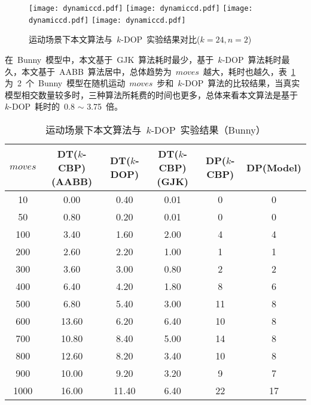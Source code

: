\begin{figure}[htbp] 
\centering
{}
{  
   \texttt{[image: dynamiccd.pdf]}
}
{  
    \texttt{[image: dynamiccd.pdf]}
}\linebreak %
{  
   \texttt{[image: dynamiccd.pdf]}
}
{  
   \texttt{[image: dynamiccd.pdf]}
}

\caption{运动场景下本文算法与~$k$-DOP~实验结果对比($k=24,n=2$)}
\label{fig:chart:exps:kdop:kcbp:k24:dynamic}
\end{figure}

在~Bunny~模型中，本文基于~GJK~算法耗时最少，基于~$k$-DOP~算法耗时最久，本文基于~AABB~算法居中，总体趋势为~$moves$~越大，耗时也越久，表~\ref{tab:exp:bunny:k24:kdop:kcbp:detail:dynamic}~
为~2~个~Bunny~模型在随机运动~$moves$~步和~$k$-DOP~算法的比较结果，当真实模型相交数量较多时，三种算法所耗费的时间也更多，总体来看本文算法是基于~$k$-DOP~耗时的~0.8 $\sim$ 3.75~倍。

\begin{table}[htbp]  
\centering
\caption{运动场景下本文算法与~$k$-DOP~实验结果（Bunny）}
\label{tab:exp:bunny:k24:kdop:kcbp:detail:dynamic}
\begin{tabular}{cccccc}
\toprule[1.5pt]
$moves$ & DT($k$-CBP)(AABB) &DT($k$-DOP) & DT($k$-CBP)(GJK) & DP($k$-CBP) & DP(Model) \\
\midrule[1.0pt]
10  &   0.00  &	  0.40 & 	0.01&  0	& 0 \\
50  &   0.80  &	  0.20 & 	0.01&  0	& 0 \\
100 &   3.40  &	  1.60 & 	2.00&  4	& 4 \\
200 &   2.60  &	  2.20 & 	1.00&  1	& 1 \\
300 &   3.60  &	  3.00 & 	0.80&  2	& 2 \\
400 &   6.40  &	  4.20 & 	1.80&  8	& 6 \\
500 &   6.80  &	  5.40 & 	3.00&  11	& 8 \\
600 &   13.60 &   6.20 & 	6.40&  10	& 8 \\
700 &   10.80 &   8.40 & 	5.00&  14	& 8 \\
800 &   12.60 &   8.20 & 	3.40&  10	& 8 \\
900 &   10.00 &   9.20 & 	3.20&  9	& 7 \\
1000&   16.00 &   11.40&	6.40&  22	& 17 \\
\bottomrule[1.5pt]
\end{tabular}
\end{table}

